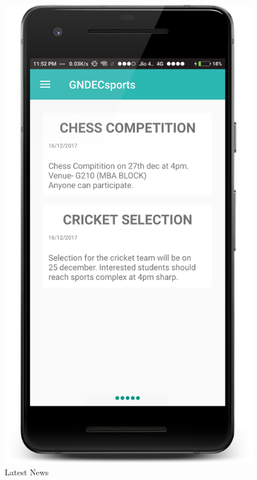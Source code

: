 \begin{figure}[ht]
\centering
\includegraphics[scale=0.20]{images/S4.png}
\caption{Latest News}
\end{figure}

\newpage

